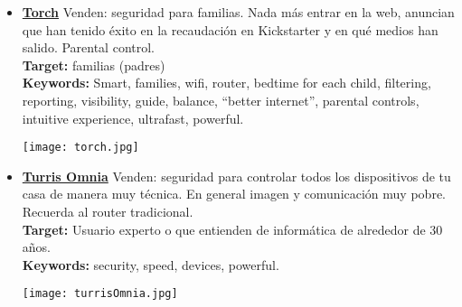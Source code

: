 \begin{itemize}
	\item \href{https://mytorch.com/}{\textbf{Torch}} Venden: seguridad para familias. Nada más entrar en la web, anuncian que han tenido éxito en la recaudación en Kickstarter y en qué medios han salido. Parental control.\\
	\textbf{Target:} familias (padres)\\
	\textbf{Keywords:} Smart, families, wifi, router, bedtime for each child, filtering, reporting, visibility, guide, balance, “better internet”, parental controls, intuitive experience, ultrafast, powerful.\\
	\begin{center}
		\texttt{[image: torch.jpg]}
	\end{center}
	
	\newpage
	\item \href{https://omnia.turris.cz/en/#features}{\textbf{Turris Omnia}} Venden: seguridad para controlar todos los dispositivos de tu casa de manera muy técnica. En general imagen y comunicación muy pobre. Recuerda al router tradicional.\\
	\textbf{Target:} Usuario experto o que entienden de informática de alrededor de 30 años.\\
	\textbf{Keywords:} security, speed, devices, powerful.\\
	\begin{center}
		\texttt{[image: turrisOmnia.jpg]}
	\end{center}
	

\end{itemize}
